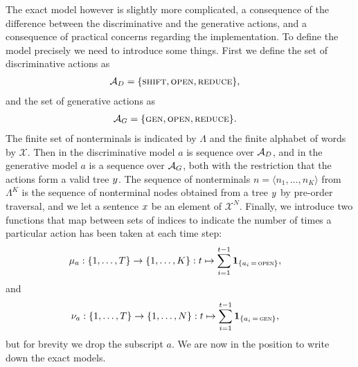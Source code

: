 The exact model however is slightly more complicated, a consequence of the difference between the discriminative and the generative actions, and a consequence of practical concerns regarding the implementation. To define the model precisely we need to introduce some things. First we define the set of discriminative actions as
\begin{align}
  \mathcal{A}_D &= \{ \textsc{shift}, \textsc{open}, \textsc{reduce} \},
\end{align}
and the set of generative actions as
\begin{align}
  \mathcal{A}_G &= \{ \textsc{gen}, \textsc{open}, \textsc{reduce} \}.
\end{align}
The finite set of nonterminals is indicated by $\Lambda$ and the finite alphabet of words by $\mathcal{X}$. Then in the discriminative model $a$ is sequence over $\mathcal{A}_D$, and in the generative model $a$ is a sequence over $\mathcal{A}_G$, both with the restriction that the actions form a valid tree $y$. The sequence of nonterminals $n = \langle n_1, \dots, n_K \rangle$ from $\Lambda^K$ is the sequence of nonterminal nodes obtained from a tree $y$ by pre-order traversal, and we let a sentence $x$ be an element of $\mathcal{X}^N$. Finally, we introduce two functions that map between sets of indices to indicate the number of times a particular action has been taken at each time step:
\begin{align*}
  \mu_a &: \{ 1, \dots, T \} \to \{ 1, \dots, K \}: t \mapsto \sum_{i=1}^{t-1} \operatorname{\mathbf{1}}_{ \{ a_i \, = \, \textsc{open} \} },
\end{align*}
and
\begin{align*}
  \nu_a &: \{ 1, \dots, T \} \to \{ 1, \dots, N \}: t \mapsto \sum_{i=1}^{t-1} \operatorname{\mathbf{1}}_{ \{ a_i \, = \, \textsc{gen} \} },
\end{align*}
but for brevity we drop the subscript $a$. We are now in the position to write down the exact models.

